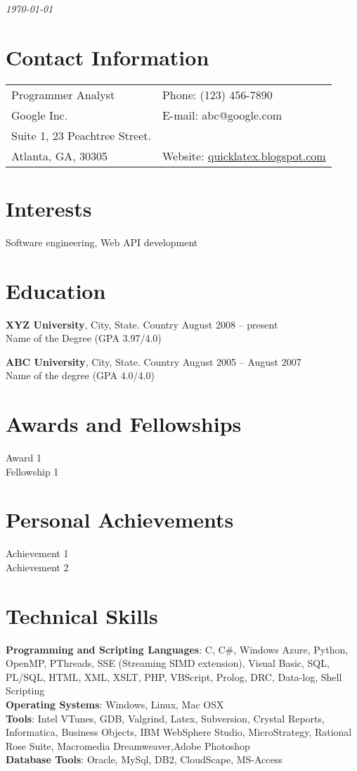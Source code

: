 \documentclass[margin,line]{res}
\begin{document}
 \hfill {\em \today}

\begin{resume}
\section{\sc Contact Information}

\vspace{.05in}
\begin{tabular}{@{}p{3.5in}p{3in}}
Programmer Analyst             & {Phone:}  (123) 456-7890 \\
Google Inc. 
 & {E-mail:}  abc@google.com\\
Suite 1, 23 Peachtree Street.\\
Atlanta, GA, 30305  & {Website:} \url{quicklatex.blogspot.com}
\end{tabular}


\section{\sc Interests}

Software engineering, Web API development

\section{\sc Education}
{\bf XYZ University}, City, State. Country \hfill August 2008 -- present\\
Name of the Degree \hfill(GPA 3.97/4.0)

{\bf ABC University}, City, State. Country \hfill August 2005 -- August 2007\\
Name of the degree \hfill(GPA 4.0/4.0)

\section{\sc Awards and Fellowships}
Award 1\\
Fellowship 1\\
\section{\sc Personal Achievements}
Achievement 1\\
Achievement 2\\
\section{\sc Technical Skills}
{\bf Programming and Scripting Languages}:  C, C\#, Windows Azure, Python, OpenMP, PThreads, SSE (Streaming SIMD extension), Visual Basic, SQL, PL/SQL, HTML, XML, XSLT, PHP, VBScript, Prolog, DRC, Data-log, Shell Scripting\\
{\bf Operating Systems}: Windows, Linux, Mac OSX\\
{\bf Tools}: Intel VTunes, GDB, Valgrind, Latex, Subversion, Crystal Reports, Informatica, Business Objects, IBM WebSphere Studio, MicroStrategy, Rational Rose Suite, Macromedia Dreamweaver,Adobe Photoshop \\
{\bf Database Tools}: Oracle, MySql, DB2, CloudScape, MS-Access 

\end{resume}
\end{document}
